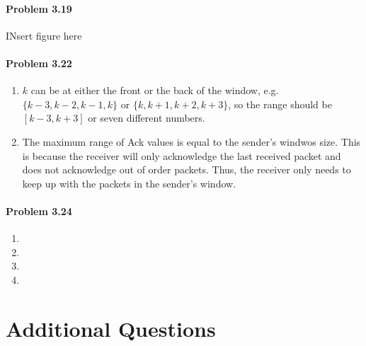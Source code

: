 \documentclass[12pt]{article}
\begin{document}
\paragraph{Problem 3.19}
INsert figure here

\paragraph{ Problem 3.22}
\begin{enumerate}[label=\textbf{Part \alph*)}]
	\item $k$ can be at either the front or the back of the window, e.g. $\{k-3, k-2, k-1, k\}$ or $\{k, k+1, k+2, k+3\}$, so the range should be $[k-3, k+3]$ or seven different numbers. 
	\item The maximum range of Ack values is equal to the sender's windwos size. This is because the receiver will only acknowledge the last received packet and does not acknowledge out of order packets. Thus, the receiver only needs to keep up with the packets in the sender's window.
\end{enumerate}

\paragraph{Problem 3.24}
\begin{enumerate}[label=\textbf{Part \alph*)}]
	\item 
	\item
	\item
	\item
\end{enumerate}
\section{Additional Questions}
\end{document}
